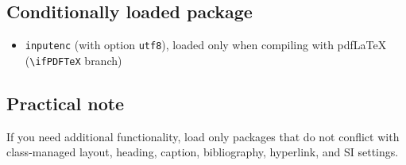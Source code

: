 \documentclass{imeko_wc}
\begin{document}
\subsection{Conditionally loaded package}
\begin{itemize}
\item \verb|inputenc| (with option \verb|utf8|), loaded only when compiling with pdf\LaTeX{} (\verb|\ifPDFTeX| branch)
\end{itemize}

\subsection{Practical note}
If you need additional functionality, load only packages that do not conflict with class-managed layout, heading, caption, bibliography, hyperlink, and SI settings.
\end{document}
